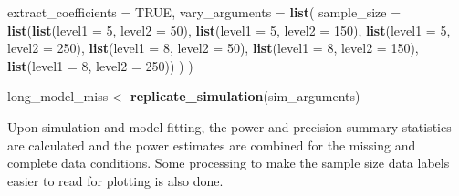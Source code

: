 \documentclass[man,mask,floatsintext]{apa6}
\newenvironment{Shaded}{\begin{snugshade}}{\end{snugshade}}
\newcommand{\DataTypeTok}[1]{\textcolor[rgb]{0.13,0.29,0.53}{#1}}
\newcommand{\DecValTok}[1]{\textcolor[rgb]{0.00,0.00,0.81}{#1}}
\newcommand{\KeywordTok}[1]{\textcolor[rgb]{0.13,0.29,0.53}{\textbf{#1}}}
\newcommand{\NormalTok}[1]{#1}
\newcommand{\OtherTok}[1]{\textcolor[rgb]{0.56,0.35,0.01}{#1}}
\newcommand{\StringTok}[1]{\textcolor[rgb]{0.31,0.60,0.02}{#1}}
\begin{document}
\begin{Shaded}
\begin{Highlighting}[]
  \DataTypeTok{extract_coefficients =} \OtherTok{TRUE}\NormalTok{,}
  \DataTypeTok{vary_arguments =} \KeywordTok{list}\NormalTok{(}
    \DataTypeTok{sample_size =} \KeywordTok{list}\NormalTok{(}\KeywordTok{list}\NormalTok{(}\DataTypeTok{level1 =} \DecValTok{5}\NormalTok{, }\DataTypeTok{level2 =} \DecValTok{50}\NormalTok{),}
                       \KeywordTok{list}\NormalTok{(}\DataTypeTok{level1 =} \DecValTok{5}\NormalTok{, }\DataTypeTok{level2 =} \DecValTok{150}\NormalTok{),}
                       \KeywordTok{list}\NormalTok{(}\DataTypeTok{level1 =} \DecValTok{5}\NormalTok{, }\DataTypeTok{level2 =} \DecValTok{250}\NormalTok{),}
                       \KeywordTok{list}\NormalTok{(}\DataTypeTok{level1 =} \DecValTok{8}\NormalTok{, }\DataTypeTok{level2 =} \DecValTok{50}\NormalTok{),}
                       \KeywordTok{list}\NormalTok{(}\DataTypeTok{level1 =} \DecValTok{8}\NormalTok{, }\DataTypeTok{level2 =} \DecValTok{150}\NormalTok{),}
                       \KeywordTok{list}\NormalTok{(}\DataTypeTok{level1 =} \DecValTok{8}\NormalTok{, }\DataTypeTok{level2 =} \DecValTok{250}\NormalTok{))}
\NormalTok{  )}
\NormalTok{)}

\NormalTok{long_model_miss <-}\StringTok{ }\KeywordTok{replicate_simulation}\NormalTok{(sim_arguments) }
\end{Highlighting}
\end{Shaded}

Upon simulation and model fitting, the power and precision summary statistics are calculated and the power estimates are combined for the missing and complete data conditions. Some processing to make the sample size data labels easier to read for plotting is also done.
\end{document}
